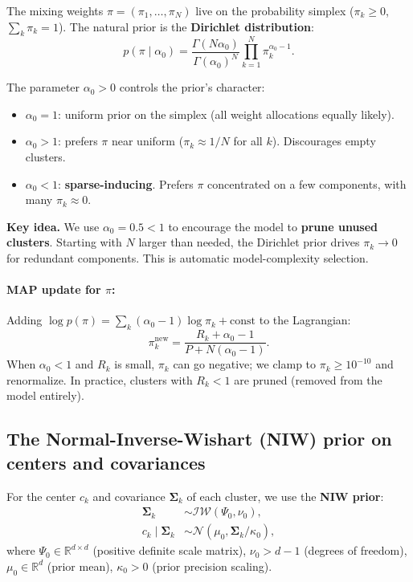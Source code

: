 \documentclass[11pt]{article}
\theoremstyle{definition}
\theoremstyle{plain}
\theoremstyle{remark}
\newcommand{\R}{\mathbb{R}}
\newcommand{\Sv}{\boldsymbol{\Sigma}}
\newenvironment{keyidea}{\par\medskip\noindent\textbf{Key idea.} }{\par\medskip}
\begin{document}
The mixing weights $\pi=(\pi_1,\dots,\pi_N)$ live on the probability simplex ($\pi_k\geq 0$, $\sum_k\pi_k=1$). The natural prior is the \textbf{Dirichlet distribution}:
\begin{equation}
  p(\pi\mid\alpha_0) = \frac{\Gamma(N\alpha_0)}{\Gamma(\alpha_0)^N}\prod_{k=1}^N \pi_k^{\alpha_0-1}.
  \label{eq:dirichlet}
\end{equation}

The parameter $\alpha_0>0$ controls the prior's character:
\begin{itemize}[leftmargin=*,itemsep=2pt]
  \item $\alpha_0=1$: uniform prior on the simplex (all weight allocations equally likely).
  \item $\alpha_0>1$: prefers $\pi$ near uniform ($\pi_k\approx 1/N$ for all $k$). Discourages empty clusters.
  \item $\alpha_0<1$: \textbf{sparse-inducing}. Prefers $\pi$ concentrated on a few components, with many $\pi_k\approx 0$.
\end{itemize}

\begin{keyidea}
We use $\alpha_0=0.5<1$ to encourage the model to \textbf{prune unused clusters}. Starting with $N$ larger than needed, the Dirichlet prior drives $\pi_k\to 0$ for redundant components. This is automatic model-complexity selection.
\end{keyidea}

\paragraph{MAP update for $\pi$:} Adding $\log p(\pi)=\sum_k(\alpha_0-1)\log\pi_k+\text{const}$ to the Lagrangian:
\begin{equation}
  \pi_k^{\mathrm{new}} = \frac{R_k+\alpha_0-1}{P+N(\alpha_0-1)}.
  \label{eq:pi-map}
\end{equation}
When $\alpha_0<1$ and $R_k$ is small, $\pi_k$ can go negative; we clamp to $\pi_k\geq 10^{-10}$ and renormalize. In practice, clusters with $R_k<1$ are pruned (removed from the model entirely).

\subsection{The Normal-Inverse-Wishart (NIW) prior on centers and covariances}

For the center $c_k$ and covariance $\Sv_k$ of each cluster, we use the \textbf{NIW prior}:
\begin{align}
  \Sv_k &\sim \mathcal{IW}(\Psi_0,\nu_0), \\
  c_k\mid\Sv_k &\sim \mathcal{N}(\mu_0,\Sv_k/\kappa_0),
\end{align}
where $\Psi_0\in\R^{d\times d}$ (positive definite scale matrix), $\nu_0>d-1$ (degrees of freedom), $\mu_0\in\R^d$ (prior mean), $\kappa_0>0$ (prior precision scaling).
\end{document}
